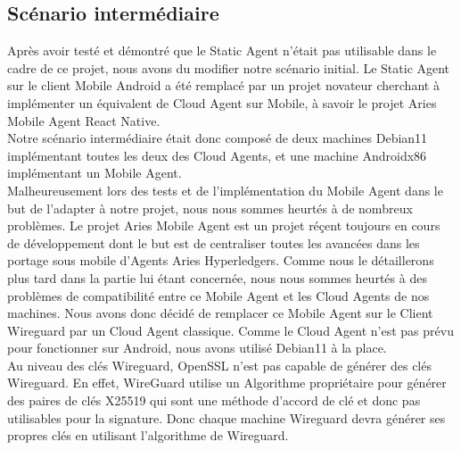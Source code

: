 \documentclass[12pt, openany]{report}
\begin{document}
\subsection{Scénario intermédiaire}
\noindent
\begin{flushleft}
Après avoir testé et démontré que le Static Agent n'était pas utilisable dans le cadre de ce projet, nous avons du modifier notre scénario initial. Le Static Agent sur le client Mobile Android a été remplacé par un projet novateur cherchant à implémenter un équivalent de Cloud Agent sur Mobile, à savoir le projet Aries Mobile Agent React Native.\\
Notre scénario intermédiaire était donc composé de deux machines Debian11 implémentant toutes les deux des Cloud Agents, et une machine Androidx86 implémentant un Mobile Agent. \\
\vspace{2mm}
Malheureusement lors des tests et de l'implémentation du Mobile Agent dans le but de l'adapter à notre projet, nous nous sommes heurtés à de nombreux problèmes. Le projet Aries Mobile Agent est un projet réçent toujours en cours de développement dont le but est de centraliser toutes les avancées dans les portage sous mobile d'Agents Aries Hyperledgers. Comme nous le détaillerons plus tard dans la partie lui étant concernée, nous nous sommes heurtés à des problèmes de compatibilité entre ce Mobile Agent et les Cloud Agents de nos machines. Nous avons donc décidé de remplacer ce Mobile Agent sur le Client Wireguard par un Cloud Agent classique. Comme le Cloud Agent n'est pas prévu pour fonctionner sur Android, nous avons utilisé Debian11 à la place. \\
\vspace{2mm}
Au niveau des clés Wireguard, OpenSSL n'est pas capable de générer des clés Wireguard. En effet, WireGuard utilise un Algorithme propriétaire pour générer des paires de clés X25519 qui sont une méthode d'accord de clé et donc pas utilisables pour la signature. Donc chaque machine Wireguard devra générer ses propres clés en utilisant l'algorithme de Wireguard.
\end{flushleft}
\end{document}
